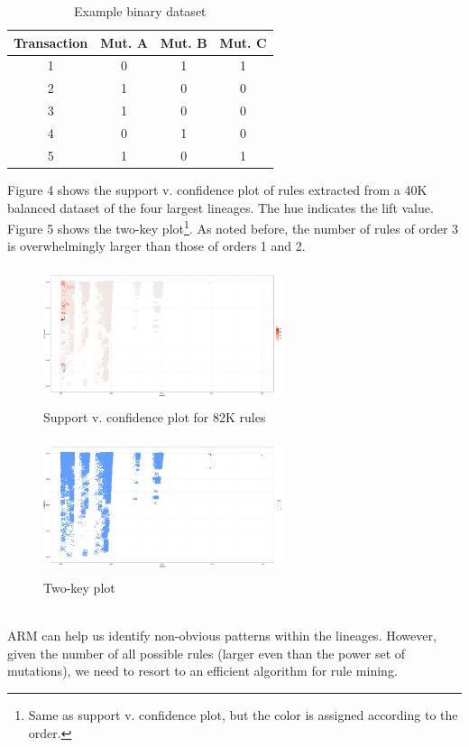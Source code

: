 \documentclass[twoside,twocolumn]{article}
\begin{document}
	\begin{table}
		\caption{Example binary dataset}
		\centering
		\renewcommand{\arraystretch}{1.2} %
		\begin{tabular}{| c | c | c | c | }
			\hline
			Transaction & Mut. A & Mut. B & Mut. C\\
			\hline
			1& 0 & 1 & 1 \\
			2 & 1 & 0&0 \\
			3 & 1 & 0&0 \\
			4 & 0 & 1 &0\\
			5 & 1 & 0 &1\\
			\hline
		\end{tabular}
	\end{table}
	Figure 4 shows the support v. confidence plot of rules extracted from a 40K balanced dataset of the four largest lineages. The hue indicates the lift value. Figure 5 shows the two-key plot\footnote{Same as support v. confidence plot, but the color is assigned according to the order.}. As noted before, the number of rules of order 3 is overwhelmingly larger than those of orders 1 and 2.
	\begin{figure}[h]
		\caption{Support v. confidence plot for 82K rules}
		\label{ruleslift}
		\centering
		\includegraphics[width=70mm, height=40mm]{rules1.png}
	\end{figure}
	\begin{figure}[h]
		\caption{Two-key plot}
		\label{rulesorder}
		\centering
		\includegraphics[width=70mm, height=40mm]{rules2.png}
	\end{figure}
	\\
	ARM can help us identify non-obvious patterns within the lineages. However, given the number of all possible rules (larger even than the power set of mutations), we need to resort to an efficient algorithm for rule mining.
\end{document}
